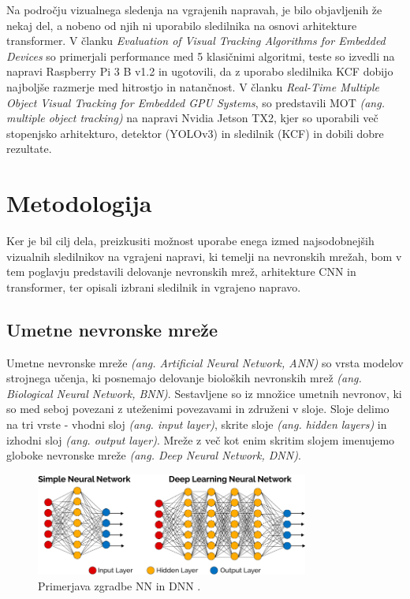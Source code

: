 \documentclass[a4paper,12pt,openright]{book}
\begin{document}
Na področju vizualnega sledenja na vgrajenih napravah, je bilo objavljenih že nekaj del, a nobeno od njih ni uporabilo sledilnika na osnovi arhitekture transformer. V članku \emph{Evaluation of Visual Tracking Algorithms for Embedded Devices}\cite{evaluation_of_visual_tracking_algorithms_for_embedded_devices} so primerjali performance med 5 klasičnimi algoritmi, teste so izvedli na napravi Raspberry Pi 3 B v1.2 in ugotovili, da z uporabo sledilnika KCF dobijo najboljše razmerje med hitrostjo in natančnost. V članku \emph{Real-Time Multiple Object Visual Tracking for Embedded GPU Systems}\cite{real_time_multiple_object_visual_tracking_for_embedded_gpu_systems}, so predstavili MOT \emph{(ang. multiple object tracking)} na napravi Nvidia Jetson TX2, kjer so uporabili več stopenjsko arhitekturo, detektor (YOLOv3) in sledilnik (KCF) in dobili dobre rezultate.


\chapter{Metodologija}
\label{ch1}
Ker je bil cilj dela, preizkusiti možnost uporabe enega izmed najsodobnejših vizualnih sledilnikov na vgrajeni napravi, ki temelji na nevronskih mrežah, bom v tem poglavju predstavili delovanje nevronskih mrež, arhitekture CNN in transformer, ter opisali izbrani sledilnik in vgrajeno napravo.

\section{Umetne nevronske mreže}
Umetne nevronske mreže \emph{(ang. Artificial Neural Network, ANN)} so vrsta modelov strojnega učenja, ki posnemajo delovanje bioloških nevronskih mrež \emph{(ang. Biological Neural Network, BNN)}. Sestavljene so iz množice umetnih nevronov, ki so med seboj povezani z uteženimi povezavami in združeni v sloje. Sloje delimo na tri vrste - vhodni sloj \emph{(ang. input layer)}, skrite sloje \emph{(ang. hidden layers)} in izhodni sloj \emph{(ang. output layer)}. Mreže z več kot enim skritim slojem imenujemo globoke nevronske mreže \emph{(ang. Deep Neural Network, DNN)}.

\begin{figure}[htb]
    \begin{center}
        \includegraphics[width=0.8\textwidth]{img/nn_vs_dnn.png}
    \end{center}
    \caption{Primerjava zgradbe NN in DNN \cite{nn_vs_dnn}.}
    \label{img:nn_vs_dnn}
\end{figure}
\end{document}
